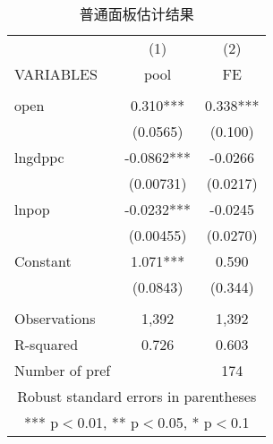 \documentclass[10pt]{article}
\begin{document}
    \begin{table}[ht]
        \begin{center}
            \caption{普通面板估计结果} \label{tb:panel}
            \begin{tabular}{lcc} \hline \hline
                 & (1) & (2) \\
                VARIABLES & pool & FE \\ \hline
                 &  &  \\
                open & 0.310*** & 0.338*** \\
                 & (0.0565) & (0.100) \\
                lngdppc & -0.0862*** & -0.0266 \\
                 & (0.00731) & (0.0217) \\
                lnpop & -0.0232*** & -0.0245 \\
                 & (0.00455) & (0.0270) \\
                Constant & 1.071*** & 0.590 \\
                 & (0.0843) & (0.344) \\
                 &  &  \\
                Observations & 1,392 & 1,392 \\
                R-squared & 0.726 & 0.603 \\
                 Number of pref &  & 174 \\ \hline \hline
                \multicolumn{3}{c}{ Robust standard errors in parentheses} \\
                \multicolumn{3}{c}{ *** p$<$0.01, ** p$<$0.05, * p$<$0.1} \\
            \end{tabular}
        \end{center}
    \end{table}
\end{document}

